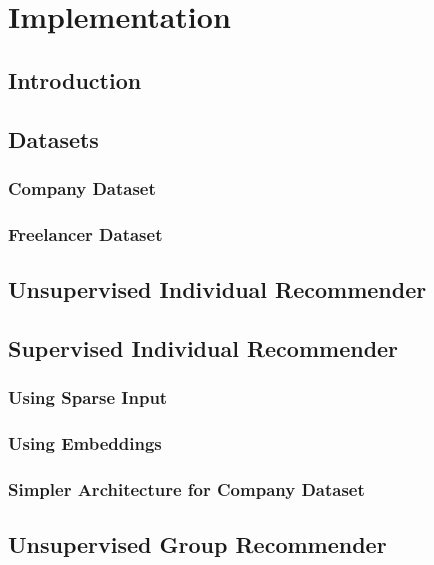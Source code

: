 
\chapter{Implementation}\label{chapter:implementation}

\section{Introduction}

\section{Datasets}

\subsection{Company Dataset}

\subsection{Freelancer Dataset}

\section{Unsupervised Individual Recommender}

\section{Supervised Individual Recommender}

\subsection{Using Sparse Input}

\subsection{Using Embeddings}

\subsection{Simpler Architecture for Company Dataset}

\section{Unsupervised Group Recommender}

